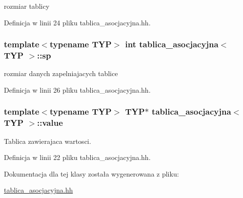 rozmiar tablicy 



Definicja w linii 24 pliku tablica\-\_\-asocjacyjna.\-hh.

\hypertarget{classtablica__asocjacyjna_a2af0a8be0f335f5ad09f908cb08c0039}{
\subsubsection[{sp}]{\setlength{\rightskip}{0pt plus 5cm}template$<$typename T\-Y\-P$>$ int {\bf tablica\-\_\-asocjacyjna}$<$ T\-Y\-P $>$\-::sp\hspace{0.3cm}{\ttfamily [private]}}}\label{classtablica__asocjacyjna_a2af0a8be0f335f5ad09f908cb08c0039}


rozmiar danych zapelniajacych tablice 



Definicja w linii 26 pliku tablica\-\_\-asocjacyjna.\-hh.

\hypertarget{classtablica__asocjacyjna_a28719743b86b0a16db652afda20b665c}{
\subsubsection[{value}]{\setlength{\rightskip}{0pt plus 5cm}template$<$typename T\-Y\-P$>$ T\-Y\-P$\ast$ {\bf tablica\-\_\-asocjacyjna}$<$ T\-Y\-P $>$\-::value\hspace{0.3cm}{\ttfamily [private]}}}\label{classtablica__asocjacyjna_a28719743b86b0a16db652afda20b665c}


Tablica zawierajaca wartosci. 



Definicja w linii 22 pliku tablica\-\_\-asocjacyjna.\-hh.



Dokumentacja dla tej klasy została wygenerowana z pliku\-:\begin{DoxyCompactItemize}
\item 
\hyperlink{tablica__asocjacyjna_8hh}{tablica\-\_\-asocjacyjna.\-hh}\end{DoxyCompactItemize}
